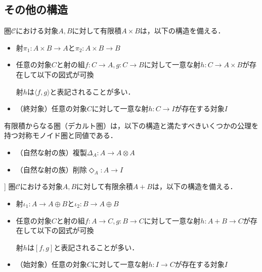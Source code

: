 \documentclass[type_judgement.tex]{subfiles}
\begin{document}
\subsection{その他の構造}
\begin{defn}
圏$\mathcal{C}$における対象$A,B$に対して有限積$A \times B$は，以下の構造を備える．
\begin{itemize}
    \item 射$\pi_1:A \times B \rightarrow A$と$\pi_2:A \times B \rightarrow B$
    \item 任意の対象$C$と射の組$f:C \rightarrow A, g:C \rightarrow B$に対して一意な射$h:C \rightarrow A \times B$が存在して以下の図式が可換
    \begin{center}
    \end{center}
    射$h$は$\langle f,g \rangle$と表記されることが多い．
    \item （終対象）任意の対象$C$に対して一意な射$h:C \rightarrow I$が存在する対象$I$
\end{itemize}

\end{defn}
有限積からなる圏（デカルト圏）は，以下の構造と満たすべきいくつかの公理\cite{selinger09}を持つ対称モノイド圏と同値である．
\begin{itemize}
    \item （自然な射の族）複製$\Delta_A:A \rightarrow A \otimes A$
    \item （自然な射の族）削除$\Diamond_A:A \rightarrow I$
\end{itemize}

\begin{defn}]
圏$\mathcal{C}$における対象$A,B$に対して有限余積$A + B$は，以下の構造を備える．
\begin{itemize}
    \item 射$\iota_1:A \rightarrow A \oplus B$と$\iota_2:B \rightarrow A \oplus B$
    \item 任意の対象$C$と射の組$f:A \rightarrow C, g:B \rightarrow C$に対して一意な射$h:A + B \rightarrow C$が存在して以下の図式が可換
    \begin{center}
    \end{center}
        射$h$は$[ f,g ]$と表記されることが多い．
    \item （始対象）任意の対象$C$に対して一意な射$h:I \rightarrow C$が存在する対象$I$
\end{itemize}
\end{defn}
\end{document}

